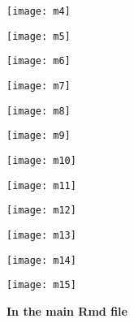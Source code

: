 \documentclass[12pt,twoside]{reedthesis}
\begin{document}
  \begin{center}\texttt{[image: m4]} \end{center}
  
  \begin{center}\texttt{[image: m5]} \end{center}
  
  \begin{center}\texttt{[image: m6]} \end{center}
  
  \begin{center}\texttt{[image: m7]} \end{center}
  
  \begin{center}\texttt{[image: m8]} \end{center}
  
  \begin{center}\texttt{[image: m9]} \end{center}
  
  \begin{center}\texttt{[image: m10]} \end{center}
  
  \begin{center}\texttt{[image: m11]} \end{center}
  
  \begin{center}\texttt{[image: m12]} \end{center}
  
  \begin{center}\texttt{[image: m13]} \end{center}
  
  \begin{center}\texttt{[image: m14]} \end{center}
  
  \begin{center}\texttt{[image: m15]} \end{center}
  
  \textbf{In the main Rmd file}
  
  \begin{Shaded}
  \begin{Highlighting}[]
    \NormalTok{(}\NormalTok{, } \NormalTok{)}
    \NormalTok{(}\NormalTok{)}
  \end{Highlighting}
  \end{Shaded}
  
\end{document}

